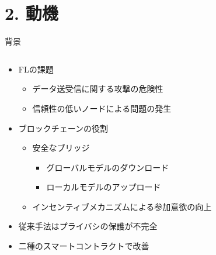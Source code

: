 \documentclass[unicode,12pt,aspectratio=169, dvipdfmx]{beamer}
\begin{document}
    \section{2. 動機}
    \begin{frame}{背景}
        \begin{columns}
            \begin{column}[T]{.6\linewidth}
                \begin{itemize}
                    \item FLの課題
                    \begin{itemize}
                        \item データ送受信に関する攻撃の危険性
                        \item 信頼性の低いノードによる問題の発生
                    \end{itemize}
                    \item ブロックチェーンの役割
                    \begin{itemize}
                        \item 安全なブリッジ
                        \begin{itemize}
                            \item グローバルモデルのダウンロード
                            \item ローカルモデルのアップロード
                        \end{itemize}
                    \item インセンティブメカニズムによる参加意欲の向上
                    \end{itemize}
                    \item 従来手法はプライバシの保護が不完全
                    \item 二種のスマートコントラクトで改善
                \end{itemize}
            \end{column}
        \end{columns}
    \end{frame}
\end{document}
